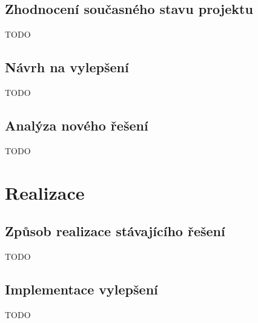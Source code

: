 \documentclass[thesis=B,czech]{FITthesis}[2012/06/26]
\begin{document}
\section{Zhodnocení současného stavu projektu}
TODO
\section{Návrh na vylepšení}
TODO
\section{Analýza nového řešení}
TODO


\chapter{Realizace}

\section{Způsob realizace stávajícího řešení}
TODO
\section{Implementace vylepšení}
TODO

\begin{conclusion}
\end{conclusion}


%
%
\end{document}
